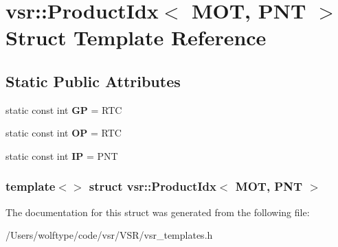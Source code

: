 \hypertarget{structvsr_1_1_product_idx_3_01_m_o_t_00_01_p_n_t_01_4}{\section{vsr\-:\-:Product\-Idx$<$ M\-O\-T, P\-N\-T $>$ Struct Template Reference}
\label{structvsr_1_1_product_idx_3_01_m_o_t_00_01_p_n_t_01_4}
}
\subsection*{Static Public Attributes}
\begin{DoxyCompactItemize}
\item 
\hypertarget{structvsr_1_1_product_idx_3_01_m_o_t_00_01_p_n_t_01_4_a0d3692b45bd593cd46f449f264776ed5}{static const int {\bfseries G\-P} = R\-T\-C}\label{structvsr_1_1_product_idx_3_01_m_o_t_00_01_p_n_t_01_4_a0d3692b45bd593cd46f449f264776ed5}

\item 
\hypertarget{structvsr_1_1_product_idx_3_01_m_o_t_00_01_p_n_t_01_4_abb2c479509695ae01def5b6d291fe9c9}{static const int {\bfseries O\-P} = R\-T\-C}\label{structvsr_1_1_product_idx_3_01_m_o_t_00_01_p_n_t_01_4_abb2c479509695ae01def5b6d291fe9c9}

\item 
\hypertarget{structvsr_1_1_product_idx_3_01_m_o_t_00_01_p_n_t_01_4_a6af6863c8dc5c7a6040dd287ee0d9779}{static const int {\bfseries I\-P} = P\-N\-T}\label{structvsr_1_1_product_idx_3_01_m_o_t_00_01_p_n_t_01_4_a6af6863c8dc5c7a6040dd287ee0d9779}

\end{DoxyCompactItemize}
\subsubsection*{template$<$$>$ struct vsr\-::\-Product\-Idx$<$ M\-O\-T, P\-N\-T $>$}



The documentation for this struct was generated from the following file\-:\begin{DoxyCompactItemize}
\item 
/\-Users/wolftype/code/vsr/\-V\-S\-R/vsr\-\_\-templates.\-h\end{DoxyCompactItemize}
